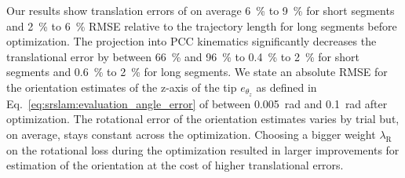 Our results show translation errors of on average \SI{6}{\percent} to \SI{9}{\percent} for short segments and \SI{2}{\percent} to \SI{6}{\percent} \gls{RMSE} relative to the trajectory length for long segments before optimization. 
The projection into \gls{PCC} kinematics significantly decreases the translational error by between \SI{66}{\percent} and \SI{96}{\percent} to \SI{0.4}{\percent} to \SI{2}{\percent} for short segments and \SI{0.6}{\percent} to \SI{2}{\percent} for long segments.
%
We state an absolute \gls{RMSE} for the orientation estimates of the z-axis of the tip $e_{\theta_z}$ as defined in Eq.~\ref{eq:srslam:evaluation_angle_error} of between \SI{0.005}{\radian} and \SI{0.1}{\radian} after optimization.
The rotational error of the orientation estimates varies by trial but, on average, stays constant across the optimization. 
Choosing a bigger weight $\lambda_\mathrm{R}$ on the rotational loss during the optimization resulted in larger improvements for estimation of the orientation at the cost of higher translational errors.